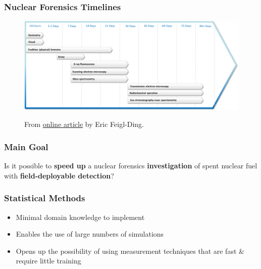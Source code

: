 \begin{frame}
  \frametitle{Nuclear Forensics Timelines}
  \begin{figure}
    \centering
    \includegraphics[width=\textwidth]{./figures/nf_timeline.png}
    \\ \raggedright \scriptsize From
    \href{https://fas.org/pir-pubs/the-false-hope-of-nuclear-forensics-assessing-the-timeliness-of-forensics-intelligence/}{\color{blue}online
    article} by Eric Feigl-Ding.
  \end{figure}
\end{frame}

\begin{frame}
  \frametitle{Main Goal}

  Is it possible to \textbf{speed up} a nuclear forensics
  \textbf{investigation} of spent nuclear fuel with \textbf{field-deployable
  detection}?

\end{frame}

\begin{frame}
  \frametitle{Statistical Methods}
  \begin{itemize}
    \item Minimal domain knowledge to implement
    \item Enables the use of large numbers of simulations
    \item Opens up the possibility of using measurement techniques that are fast \& require little training
  \end{itemize}
\end{frame}

